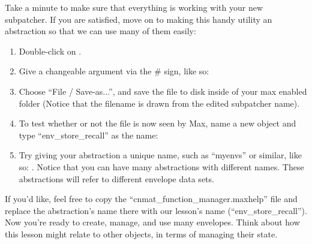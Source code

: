 Take a minute to make sure that everything is working with your new subpatcher.  If you are satisfied, move on to making this handy utility an abstraction so that we can use many of them easily:

\begin{enumerate}
\item Double-click on .
\item Give  a changeable argument via the \# sign, like so: 
\item Choose ``File / Save-as...'', and save the file to disk inside of your max enabled folder (Notice that the filename is drawn from the edited subpatcher name).
\item To test whether or not the file is now seen by Max, name a new object and type ``env\_store\_recall'' as the name:
\item Try giving your abstraction a unique name, such as ``myenvs'' or similar, like so: .  Notice that you can have many abstractions with different names.  These abstractions will refer to different envelope data sets.
\end{enumerate} 
If you'd like, feel free to copy the ``cnmat\_function\_manager.maxhelp'' file and replace the abstraction's name there with our lesson's name (``env\_store\_recall'').  Now you're ready to create, manage, and use many envelopes.  Think about how this lesson might relate to other objects, in terms of managing their state.


